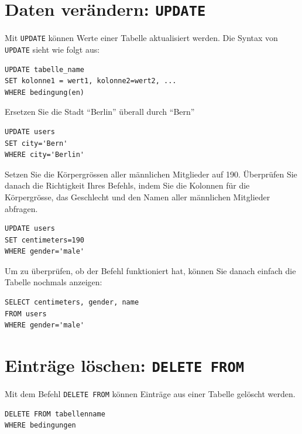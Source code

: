 \section{Daten verändern: \texorpdfstring{\lstinline|UPDATE|}{UPDATE}}

Mit \lstinline|UPDATE| können Werte einer Tabelle aktualisiert werden. Die Syntax von \lstinline|UPDATE| sieht wie folgt aus:

\begin{lstlisting}
UPDATE tabelle_name
SET kolonne1 = wert1, kolonne2=wert2, ...
WHERE bedingung(en)
\end{lstlisting}

\begin{myexercise}\label{aufgabe:evalPoly}

  Ersetzen Sie die Stadt \enquote{Berlin} überall durch \enquote{Bern}
  \begin{myanswer}
    \begin{lstlisting}
UPDATE users
SET city='Bern'
WHERE city='Berlin'
\end{lstlisting}
  \end{myanswer}
\end{myexercise}

\begin{myexercise}
  Setzen Sie die Körpergrössen aller männlichen Mitglieder auf 190. Überprüfen Sie danach die Richtigkeit Ihres Befehls, indem Sie die Kolonnen für die Körpergrösse, das Geschlecht und den Namen aller männlichen Mitglieder abfragen.
  \begin{myanswer}
    \begin{lstlisting}
UPDATE users
SET centimeters=190
WHERE gender='male'
\end{lstlisting}
Um zu überprüfen, ob der Befehl funktioniert hat, können Sie danach einfach die Tabelle nochmals anzeigen:
\begin{lstlisting}
SELECT centimeters, gender, name
FROM users
WHERE gender='male'
\end{lstlisting}

  \end{myanswer}
\end{myexercise}

\section{Einträge löschen: \texorpdfstring{\lstinline|DELETE FROM|}{DELETE FROM}}
Mit dem Befehl \lstinline|DELETE FROM| können Einträge aus einer Tabelle gelöscht werden.
\begin{lstlisting}
DELETE FROM tabellenname
WHERE bedingungen
\end{lstlisting}

